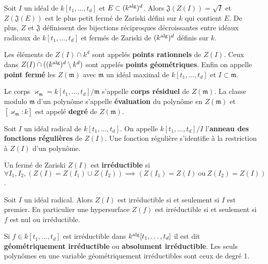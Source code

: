 	\begin{pop}
		Soit $I$ un idéal de $k[t_1,\ldots,t_d]$ et $E \subset (k^{\operatorname{alg}})^d$.
		Alors $\mathfrak{J}(Z(I)) = \surd I$ et $Z(\mathfrak{J}(E))$ est le plus petit fermé de Zariski défini sur $k$ qui contient $E$.
		De plus, $Z$ et $\mathfrak{J}$ définissent des bijections réciproques décroissantes entre idéaux radicaux de $k[t_1,\ldots,t_d]$ et fermés de Zariski de $(k^{\operatorname{alg}})^d$ définis sur $k$.
	\end{pop}
	
	\begin{defn}
		Les éléments de $Z(I) \cap k^d$ sont appelés \textbf{points rationnels} de $Z(I)$.
		Ceux dans $Z(I) \cap ((k^{\operatorname{alg}})^d \setminus k^d)$ sont appelés \textbf{points géométriques}.
		Enfin on appelle \textbf{point fermé} les $Z(\mathfrak{m})$ avec $\mathfrak{m}$ un idéal maximal de $k[t_1,\ldots,t_d]$ et $I \subset \mathfrak{m}$.
	\end{defn}
	
	\begin{defn}
		Le corps $\varkappa_{\mathfrak{m}} = k[t_1,\ldots,t_d] / \mathfrak{m}$ s'appelle \textbf{corps résiduel} de $Z(\mathfrak{m})$.
		La classe modulo $\mathfrak{m}$ d'un polynôme s'appelle \textbf{évaluation} du polynôme en $Z(\mathfrak{m})$ et $[\varkappa_{\mathfrak{m}} : k]$ est appelé \textbf{degré} de $Z(\mathfrak{m})$.
	\end{defn}
	
	\begin{defn}
		Soit $I$ un idéal radical de $k[t_1,\ldots,t_d]$.
		On appelle $k[t_1,\ldots,t_d] / I$ l'\textbf{anneau des fonctions régulières} de $Z(I)$.
		Une fonction régulière s'identifie à la restriction à $Z(I)$ d'un polynôme.
	\end{defn}
	
	\begin{defn}
		Un fermé de Zariski $Z(I)$ est \textbf{irréductible} si $\forall I_1,I_2, \left( Z(I) = Z(I_1) \cup Z(I_2) \right) \implies (Z(I_1) = Z(I)\ \text{ou}\ Z(I_2) = Z(I))$.
	\end{defn}
	
	\begin{pop}
		Soit $I$ un idéal radical.
		Alors $Z(I)$ est irréductible si et seulement si $I$ est premier.
		En particulier une hypersurface $Z(f)$ est irréductible si et seulement si $f$ est nul ou irréductible.
	\end{pop}
	
	\begin{defn}
		Si $f \in k[t_1,\ldots,t_d]$ est irréductible dans $k^{\operatorname{alg}}[t_1,\ldots,t_d]$ il est dit \textbf{géométriquement irréductible} ou \textbf{absolument irréductible}.
		Les seuls polynômes en une variable géométriquement irréductibles sont ceux de degré 1.
	\end{defn}
	

